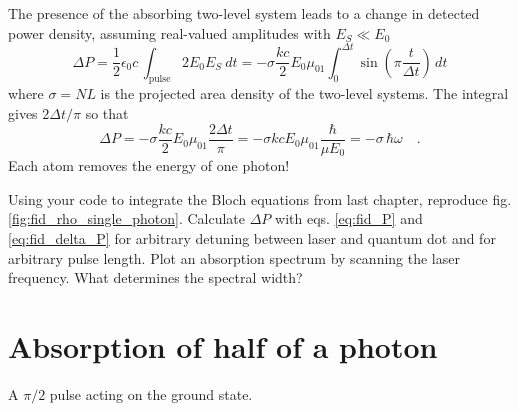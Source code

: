 The presence of the absorbing two-level system leads to a change in detected power density, assuming real-valued amplitudes with $E_S \ll E_0$
\begin{equation}
 \Delta P = \frac{1}{2} \epsilon_0 c \,  
\int_\text{pulse} 2 E_0 E_S  \ dt
  =-   \sigma \frac{k c }{2}  E_0 \mu_{01}  \int_0^{\Delta t}   \sin \left( \pi \frac{t}{\Delta t} \right)  \,  dt  \label{eq:fid_delta_P}
\end{equation}
where $\sigma = N L $ is the projected area density of the two-level systems. The integral gives $2 \Delta t/\pi$ so that
\begin{equation}
 \Delta P =-  \sigma \frac{k c}{2}  E_0 \mu_{01} \frac{2 \Delta t}{\pi}
= -  \sigma k c   E_0 \mu_{01}  \frac{\hbar}{\mu E_0} 
= -  \sigma \,  \hbar \omega   \quad .
\end{equation}
Each atom removes the energy of one photon!


\begin{questions}
\item Using your code to integrate the Bloch equations from last chapter, reproduce fig. \ref{fig:fid_rho_single_photon}. Calculate $\Delta P$  with eqs. \ref{eq:fid_P} and \ref{eq:fid_delta_P} for arbitrary detuning between laser and quantum dot and for arbitrary pulse length. Plot an absorption spectrum by scanning the laser frequency. What determines the spectral width?
\end{questions}



\section{Absorption of half of a photon}

\begin{marginfigure}



\caption{A  $\pi/2$ pulse acting on the ground state.}
\end{marginfigure}

